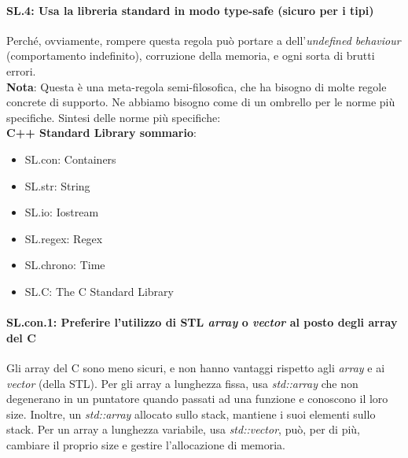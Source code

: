 \paragraph{SL.4: Usa la libreria standard in modo type-safe (sicuro per i tipi)}

\textsf{\small Perché, ovviamente, rompere questa regola può portare a dell'\emph{undefined behaviour} (comportamento indefinito), corruzione della memoria, e ogni sorta di brutti errori.} \\

\textsf{\small \textbf{Nota}: Questa è una meta-regola semi-filosofica, che ha bisogno di molte regole concrete di supporto. Ne abbiamo bisogno come di un ombrello per le norme più specifiche. Sintesi delle norme più specifiche:} \\

\textsf{\small \textbf{C++ Standard Library sommario}: }

\begin{itemize}
	\item \textsf{\small SL.con: Containers}
	\item \textsf{\small SL.str: String}
	\item \textsf{\small SL.io: Iostream}
	\item \textsf{\small SL.regex: Regex}
	\item \textsf{\small SL.chrono: Time}
	\item \textsf{\small SL.C: The C Standard Library}
\end{itemize}


\paragraph{SL.con.1: Preferire l'utilizzo di STL \emph{array} o \emph{vector} al posto degli array del C}

\textsf{\small Gli array del C sono meno sicuri, e non hanno vantaggi rispetto agli \emph{array} e ai \emph{vector} (della STL). Per gli array a lunghezza fissa, usa \emph{std::array} che non degenerano in un puntatore quando passati ad una funzione e conoscono il loro size. Inoltre, un \emph{std::array} allocato sullo stack, mantiene i suoi elementi sullo stack. Per un array a lunghezza variabile, usa \emph{std::vector}, può, per di più, cambiare il proprio size e gestire l'allocazione di memoria. } \\

